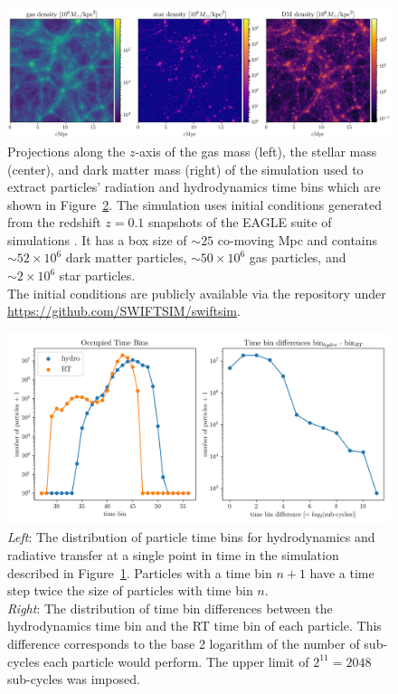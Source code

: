 \begin{figure}
 \centering
 \includegraphics[width=\textwidth]{figures/RHD/EAGLE_25_ICs.png}%
 \caption{
Projections along the $z$-axis of the gas mass (left), the stellar mass (center), and dark matter
mass (right) of the simulation used to extract particles' radiation and hydrodynamics time bins
which are shown in Figure~\ref{fig:eagle-timebins-rt}. The simulation uses initial conditions
generated from the redshift $z = 0.1$  snapshots of the EAGLE suite of simulations
\citep{schayeEAGLEProjectSimulating2015}. It has a box size of $\sim 25$ co-moving Mpc and contains
$\sim 52 \times 10^6$ dark matter particles, $\sim 50 \times 10^6$ gas particles, and $\sim 2 \times
10^6$ star particles.\\
The initial conditions are publicly available via the \swift repository under
\url{https://github.com/SWIFTSIM/swiftsim}.
 }
 \label{fig:eagle-25}
\end{figure}



\begin{figure}
 \centering
 \includegraphics[width=\textwidth]{figures/RHD/subcycling_stats-64.png}%
 \caption{
\emph{Left}: The distribution of particle time bins for hydrodynamics and radiative transfer at a
single point in time in the simulation described in Figure~\ref{fig:eagle-25}. Particles with a
time bin $n + 1$ have a time step twice the size of particles with time bin $n$.\\
\emph{Right}: The distribution of time bin differences between the hydrodynamics time bin and the
RT time bin of each particle. This difference corresponds to the base 2 logarithm of the number of
sub-cycles each particle would perform. The upper limit of $2^{11} = 2048$ sub-cycles was imposed.
 }
 \label{fig:eagle-timebins-rt}
\end{figure}





